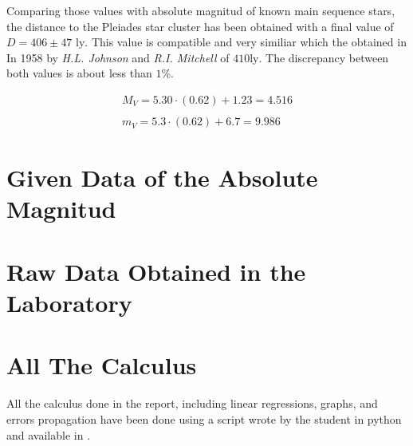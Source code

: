 \documentclass[twoside]{article}
\begin{document}
\begin{multicols}{2}
			Comparing those values with absolute magnitud of known main sequence stars, the distance to the Pleiades star cluster has been obtained with a final value of $D = 406 \pm 47 \textrm{ ly}$. This value is compatible and very similiar which the obtained in In 1958 by \textit{H.L. Johnson} and \textit{R.I. Mitchell} of $410 \textrm{ly}$. The discrepancy between both values is about less than $1\%$.

				\begin{equation}
					\begin{matrix}
						M_V = 5.30 \cdot (0.62) + 1.23 = 4.516
						\\
						\\
						m_V = 5.3 \cdot (0.62) + 6.7 = 9.986
					\end{matrix}
				\end{equation}



	\end{multicols}


	
	



			\appendix

				\section{Given Data of the Absolute Magnitud}
					\label{app:GivenData}

					

			\newpage

				\section{Raw Data Obtained in the Laboratory}
					\label{app:RawData}

					

				\section{All The Calculus}
					\label{app:calc}

					All the calculus done in the report, including linear regressions, graphs, and errors propagation have been done using a script wrote by the student in python and available in \cite{github}.
\end{document}
